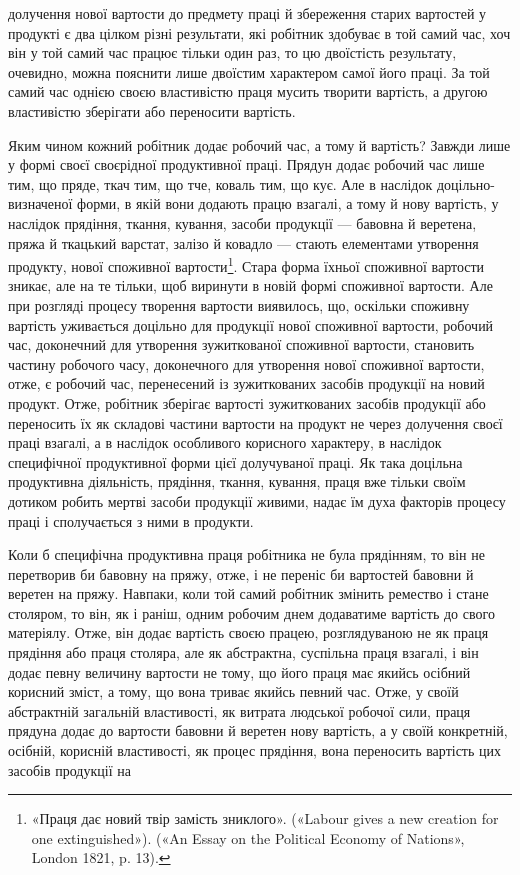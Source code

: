 \parcont{}  %
долучення нової вартости до предмету праці й збереження старих
вартостей у продукті є два цілком різні результати, які робітник
здобуває в той самий час, хоч він у той самий час працює
тільки один раз, то цю двоїстість результату, очевидно, можна
пояснити лише двоїстим характером самої його праці. За той
самий час однією своєю властивістю праця мусить творити вартість,
а другою властивістю зберігати або переносити вартість.

Яким чином кожний робітник додає робочий час, а тому й
вартість? Завжди лише у формі своєї своєрідної продуктивної
праці. Прядун додає робочий час лише тим, що пряде, ткач тим,
що тче, коваль тим, що кує. Але в наслідок доцільно-визначеної
форми, в якій вони додають працю взагалі, а тому й нову вартість,
у наслідок прядіння, ткання, кування, засоби продукції — бавовна
й веретена, пряжа й ткацький варстат, залізо й ковадло — стають
елементами утворення продукту, нової споживної вартости\footnote{
«Праця дає новий твір замість зниклого». («Labour gives a new
creation for one extinguished»). («An Essay on the Political Economy of
Nations», London 1821, p. 13).
}.
Стара форма їхньої споживної вартости зникає, але на те тільки,
щоб виринути в новій формі споживної вартости. Але при розгляді
процесу творення вартости виявилось, що, оскільки споживну
вартість уживається доцільно для продукції нової споживної
вартости, робочий час, доконечний для утворення зужиткованої
споживної вартости, становить частину робочого часу, доконечного
для утворення нової споживної вартости, отже, є робочий
час, перенесений із зужиткованих засобів продукції на новий
продукт. Отже, робітник зберігає вартості зужиткованих засобів
продукції або переносить їх як складові частини вартости на продукт
не через долучення своєї праці взагалі, а в наслідок особливого
корисного характеру, в наслідок специфічної продуктивної
форми цієї долучуваної праці. Як така доцільна продуктивна
діяльність, прядіння, ткання, кування, праця вже тільки своїм
дотиком робить мертві засоби продукції живими, надає їм духа
факторів процесу праці і сполучається з ними в продукти.

Коли б специфічна продуктивна праця робітника не була прядінням,
то він не перетворив би бавовну на пряжу, отже, і не
переніс би вартостей бавовни й веретен на пряжу. Навпаки, коли
той самий робітник змінить ремество і стане столяром, то він,
як і раніш, одним робочим днем додаватиме вартість до свого
матеріялу. Отже, він додає вартість своєю працею, розглядуваною
не як праця прядіння або праця столяра, але як абстрактна,
суспільна праця взагалі, і він додає певну величину вартости не
тому, що його праця має якийсь осібний корисний зміст, а тому,
що вона триває якийсь певний час. Отже, у своїй абстрактній
загальній властивості, як витрата людської робочої сили, праця
прядуна додає до вартости бавовни й веретен нову вартість, а
у своїй конкретній, осібній, корисній властивості, як процес
прядіння, вона переносить вартість цих засобів продукції на
\parbreak{}  %
